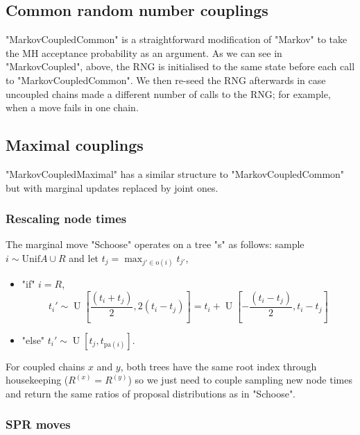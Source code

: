 \documentclass[11pt,a4paper]{article}
\newcommand{\pa}{\mathrm{pa}}
\newcommand{\off}{\mathrm{o}}
\DeclareMathOperator*{\Unif}{\mathrm{U}}
\begin{document}
\subsection{Common random number couplings}

"MarkovCoupledCommon" is a straightforward modification of "Markov" to take the MH acceptance probability as an argument. As we can see in "MarkovCoupled", above, the RNG is initialised to the same state before each call to "MarkovCoupledCommon". We then re-seed the RNG afterwards in case uncoupled chains made a different number of calls to the RNG; for example, when a move fails in one chain.

\subsection{Maximal couplings}

"MarkovCoupledMaximal" has a similar structure to "MarkovCoupledCommon" but with marginal updates replaced by joint ones.

\subsubsection{Rescaling node times}



The marginal move "Schoose" operates on a tree "s" as follows: sample $ i \sim \mathrm{Unif}{A \cup R} $ and let $ t_j = \max_{j' \in \off(i)} t_{j'} $,
\begin{itemize}
    \item "if" $ i = R $,
    \[
        t_i' \sim \Unif\left[\frac{(t_i + t_j)}{2}, 2(t_i - t_j)\right]
            = t_i + \Unif\left[-\frac{(t_i - t_j)}{2}, t_i - t_j\right]
    \]
    \item "else" $ t_i' \sim \Unif[t_j, t_{\pa(i)}] $.
\end{itemize}
For coupled chains $ x $ and $ y $, both trees have the same root index through housekeeping ($ R^{(x)} =  R^{(y)} $) so we just need to couple sampling new node times and return the same ratios of proposal distributions as in "Schoose".



\subsubsection{SPR moves}
\end{document}
